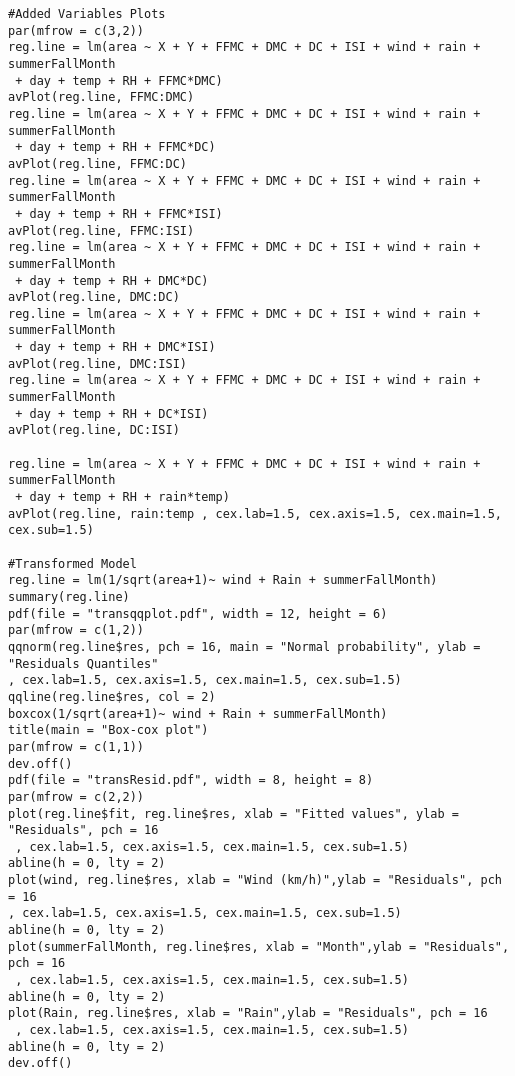 \documentclass[11pt]{report}
\begin{document}
\begin{verbatim}
#Added Variables Plots
par(mfrow = c(3,2))
reg.line = lm(area ~ X + Y + FFMC + DMC + DC + ISI + wind + rain + summerFallMonth
 + day + temp + RH + FFMC*DMC)
avPlot(reg.line, FFMC:DMC)
reg.line = lm(area ~ X + Y + FFMC + DMC + DC + ISI + wind + rain + summerFallMonth
 + day + temp + RH + FFMC*DC)
avPlot(reg.line, FFMC:DC)
reg.line = lm(area ~ X + Y + FFMC + DMC + DC + ISI + wind + rain + summerFallMonth
 + day + temp + RH + FFMC*ISI)
avPlot(reg.line, FFMC:ISI)
reg.line = lm(area ~ X + Y + FFMC + DMC + DC + ISI + wind + rain + summerFallMonth
 + day + temp + RH + DMC*DC)
avPlot(reg.line, DMC:DC)
reg.line = lm(area ~ X + Y + FFMC + DMC + DC + ISI + wind + rain + summerFallMonth
 + day + temp + RH + DMC*ISI)
avPlot(reg.line, DMC:ISI)
reg.line = lm(area ~ X + Y + FFMC + DMC + DC + ISI + wind + rain + summerFallMonth
 + day + temp + RH + DC*ISI)
avPlot(reg.line, DC:ISI)

reg.line = lm(area ~ X + Y + FFMC + DMC + DC + ISI + wind + rain + summerFallMonth
 + day + temp + RH + rain*temp)
avPlot(reg.line, rain:temp , cex.lab=1.5, cex.axis=1.5, cex.main=1.5, cex.sub=1.5)

#Transformed Model
reg.line = lm(1/sqrt(area+1)~ wind + Rain + summerFallMonth)
summary(reg.line)
pdf(file = "transqqplot.pdf", width = 12, height = 6)
par(mfrow = c(1,2))
qqnorm(reg.line$res, pch = 16, main = "Normal probability", ylab = "Residuals Quantiles"
, cex.lab=1.5, cex.axis=1.5, cex.main=1.5, cex.sub=1.5)
qqline(reg.line$res, col = 2)
boxcox(1/sqrt(area+1)~ wind + Rain + summerFallMonth)
title(main = "Box-cox plot")
par(mfrow = c(1,1))
dev.off()
pdf(file = "transResid.pdf", width = 8, height = 8)
par(mfrow = c(2,2))
plot(reg.line$fit, reg.line$res, xlab = "Fitted values", ylab = "Residuals", pch = 16
 , cex.lab=1.5, cex.axis=1.5, cex.main=1.5, cex.sub=1.5)
abline(h = 0, lty = 2)
plot(wind, reg.line$res, xlab = "Wind (km/h)",ylab = "Residuals", pch = 16 
, cex.lab=1.5, cex.axis=1.5, cex.main=1.5, cex.sub=1.5)
abline(h = 0, lty = 2)
plot(summerFallMonth, reg.line$res, xlab = "Month",ylab = "Residuals", pch = 16
 , cex.lab=1.5, cex.axis=1.5, cex.main=1.5, cex.sub=1.5)
abline(h = 0, lty = 2)
plot(Rain, reg.line$res, xlab = "Rain",ylab = "Residuals", pch = 16
 , cex.lab=1.5, cex.axis=1.5, cex.main=1.5, cex.sub=1.5)
abline(h = 0, lty = 2)
dev.off()


\end{verbatim}
\end{document}
